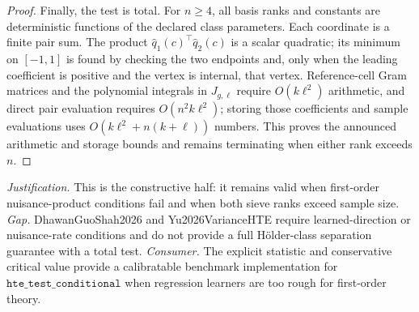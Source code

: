 \documentclass{article}
\begin{document}
\begin{proof}
Finally, the test is total.  For \(n\ge4\), all basis ranks and constants are deterministic functions of the declared class parameters.  Each coordinate is a finite pair sum.  The product \(\widehat q_1(c)^\top\widehat q_2(c)\) is a scalar quadratic; its minimum on \([-1,1]\) is found by checking the two endpoints and, only when the leading coefficient is positive and the vertex is internal, that vertex.  Reference-cell Gram matrices and the polynomial integrals in \(J_{g,\ell}\) require \(O(k\ell^2)\) arithmetic, and direct pair evaluation requires \(O(n^2k\ell^2)\); storing those coefficients and sample evaluations uses \(O(k\ell^2+n(k+\ell))\) numbers.  This proves the announced arithmetic and storage bounds and remains terminating when either rank exceeds \(n\).
\end{proof}
\par\smallskip\noindent \textit{Justification.} This is the constructive half: it remains valid when first-order nuisance-product conditions fail and when both sieve ranks exceed sample size. \textit{Gap.} DhawanGuoShah2026 and Yu2026VarianceHTE require learned-direction or nuisance-rate conditions and do not provide a full Hölder-class separation guarantee with a total test. \textit{Consumer.} The explicit statistic and conservative critical value provide a calibratable benchmark implementation for \(\texttt{hte\_test\_conditional}\) when regression learners are too rough for first-order theory.
\end{document}

